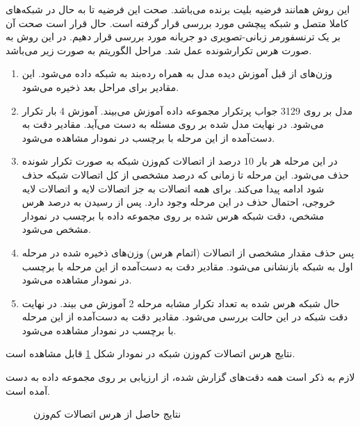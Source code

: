 این روش همانند فرضیه بلیت برنده
می‌باشد. صحت این فرضیه تا به حال در شبکه‌های کاملا متصل و شبکه پیچشی مورد بررسی قرار گرفته است. حال قرار است صحت آن بر یک ترنسفورمر زبانی-تصویری دو جریانه
 مورد بررسی قرار دهیم.
در این روش به صورت هرس تکرارشونده
عمل شد. مراحل الگوریتم به صورت زیر می‌باشد.
\begin{enumerate}
	\item وزن‌های از قبل آموزش دیده مدل
	به همراه رده‌بند
	به شبکه داده می‌شود. این مقادیر برای مراحل بعد ذخیره می‌شود.
	\item مدل بر روی 3129 جواب پرتکرار مجموعه داده
	آموزش می‌بیند. آموزش  4 بار تکرار
	می‌شود. در نهایت مدل
	شده بر روی مسئله
 به دست می‌آید.	مقادیر دقت به دست‌آمده از این مرحله با برچسب
 در نمودار‌ مشاهده می‌شود.
	\item
	در این مرحله هر بار 10 درصد از اتصالات کم‌وزن شبکه به صورت تکرار شونده حذف می‌شود. این مرحله تا زمانی که درصد مشخصی از کل اتصالات شبکه حذف شود ادامه پیدا می‌کند. برای همه اتصالات به جز اتصالات لایه 
	و اتصالات لایه خروجی، احتمال حذف در این مرحله وجود دارد. پس از رسیدن به درصد هرس مشخص، دقت شبکه هرس شده بر روی مجموعه داده 
	با برچسب 
	در نمودار مشخص می‌شود.
	\item پس حذف مقدار مشخصی از اتصالات (اتمام هرس) وزن‌های ذخیره شده در مرحله اول به شبکه بازنشانی
	 می‌شود. مقادیر دقت به دست‌آمده از این مرحله با برچسب
	در نمودار‌ مشاهده می‌شود.
	\item حال شبکه هرس شده به تعداد تکرار مشابه مرحله 2 آموزش می بیند. در نهایت دقت شبکه در این حالت بررسی می‌شود. مقادیر دقت به دست‌آمده از این مرحله با برچسب
	در نمودار‌ مشاهده می‌شود.
\end{enumerate}

نتایج هرس اتصالات کم‌وزن شبکه
 در نمودار شکل \ref{low_pruning} قابل مشاهده است.

لازم به ذکر است همه دقت‌های گزارش شده، از ارزیابی بر روی مجموعه داده 
به دست آمده است.

\begin{figure}[H]
	\caption{نتایج حاصل از هرس اتصالات کم‌وزن}
	\label{low_pruning}
\end{figure}



